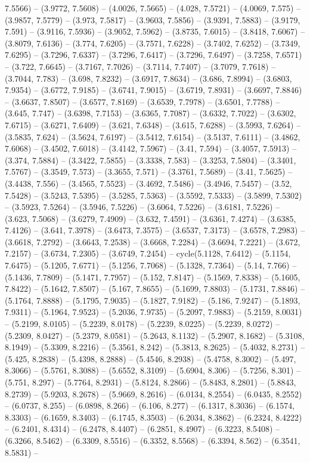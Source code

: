7.5566) -- (3.9772, 7.5608) -- (4.0026, 7.5665) -- (4.028, 7.5721) -- (4.0069, 7.575) -- (3.9857, 7.5779) -- (3.973, 7.5817) -- (3.9603, 7.5856) -- (3.9391, 7.5883) -- (3.9179, 7.591) -- (3.9116, 7.5936) -- (3.9052, 7.5962) -- (3.8735, 7.6015) -- (3.8418, 7.6067) -- (3.8079, 7.6136) -- (3.774, 7.6205) -- (3.7571, 7.6228) -- (3.7402, 7.6252) -- (3.7349, 7.6295) -- (3.7296, 7.6337) -- (3.7296, 7.6417) -- (3.7296, 7.6497) -- (3.7258, 7.6571) -- (3.722, 7.6645) -- (3.7167, 7.7026) -- (3.7114, 7.7407) -- (3.7079, 7.7618) -- (3.7044, 7.783) -- (3.698, 7.8232) -- (3.6917, 7.8634) -- (3.686, 7.8994) -- (3.6803, 7.9354) -- (3.6772, 7.9185) -- (3.6741, 7.9015) -- (3.6719, 7.8931) -- (3.6697, 7.8846) -- (3.6637, 7.8507) -- (3.6577, 7.8169) -- (3.6539, 7.7978) -- (3.6501, 7.7788) -- (3.645, 7.747) -- (3.6398, 7.7153) -- (3.6365, 7.7087) -- (3.6332, 7.7022) -- (3.6302, 7.6715) -- (3.6271, 7.6409) -- (3.621, 7.6348) -- (3.615, 7.6288) -- (3.5993, 7.6264) -- (3.5835, 7.624) -- (3.5624, 7.6197) -- (3.5412, 7.6154) -- (3.5137, 7.6111) -- (3.4862, 7.6068) -- (3.4502, 7.6018) -- (3.4142, 7.5967) -- (3.41, 7.594) -- (3.4057, 7.5913) -- (3.374, 7.5884) -- (3.3422, 7.5855) -- (3.3338, 7.583) -- (3.3253, 7.5804) -- (3.3401, 7.5767) -- (3.3549, 7.573) -- (3.3655, 7.571) -- (3.3761, 7.5689) -- (3.41, 7.5625) -- (3.4438, 7.556) -- (3.4565, 7.5523) -- (3.4692, 7.5486) -- (3.4946, 7.5457) -- (3.52, 7.5428) -- (3.5243, 7.5395) -- (3.5285, 7.5363) -- (3.5592, 7.5333) -- (3.5899, 7.5302) -- (3.5923, 7.5264) -- (3.5946, 7.5226) -- (3.6064, 7.5226) -- (3.6181, 7.5226) -- (3.623, 7.5068) -- (3.6279, 7.4909) -- (3.632, 7.4591) -- (3.6361, 7.4274) -- (3.6385, 7.4126) -- (3.641, 7.3978) -- (3.6473, 7.3575) -- (3.6537, 7.3173) -- (3.6578, 7.2983) -- (3.6618, 7.2792) -- (3.6643, 7.2538) -- (3.6668, 7.2284) -- (3.6694, 7.2221) -- (3.672, 7.2157) -- (3.6734, 7.2305) -- (3.6749, 7.2454) -- cycle(5.1128, 7.6412) -- (5.1154, 7.6475) -- (5.1205, 7.6771) -- (5.1256, 7.7068) -- (5.1328, 7.7364) -- (5.14, 7.766) -- (5.1436, 7.7809) -- (5.1471, 7.7957) -- (5.152, 7.8147) -- (5.1569, 7.8338) -- (5.1605, 7.8422) -- (5.1642, 7.8507) -- (5.167, 7.8655) -- (5.1699, 7.8803) -- (5.1731, 7.8846) -- (5.1764, 7.8888) -- (5.1795, 7.9035) -- (5.1827, 7.9182) -- (5.186, 7.9247) -- (5.1893, 7.9311) -- (5.1964, 7.9523) -- (5.2036, 7.9735) -- (5.2097, 7.9883) -- (5.2159, 8.0031) -- (5.2199, 8.0105) -- (5.2239, 8.0178) -- (5.2239, 8.0225) -- (5.2239, 8.0272) -- (5.2309, 8.0427) -- (5.2379, 8.0581) -- (5.2643, 8.1132) -- (5.2907, 8.1682) -- (5.3108, 8.1949) -- (5.3309, 8.2216) -- (5.3561, 8.242) -- (5.3813, 8.2625) -- (5.4032, 8.2731) -- (5.425, 8.2838) -- (5.4398, 8.2888) -- (5.4546, 8.2938) -- (5.4758, 8.3002) -- (5.497, 8.3066) -- (5.5761, 8.3088) -- (5.6552, 8.3109) -- (5.6904, 8.306) -- (5.7256, 8.301) -- (5.751, 8.297) -- (5.7764, 8.2931) -- (5.8124, 8.2866) -- (5.8483, 8.2801) -- (5.8843, 8.2739) -- (5.9203, 8.2678) -- (5.9669, 8.2616) -- (6.0134, 8.2554) -- (6.0435, 8.2552) -- (6.0737, 8.255) -- (6.0898, 8.266) -- (6.106, 8.277) -- (6.1317, 8.3036) -- (6.1574, 8.3303) -- (6.1659, 8.3403) -- (6.1745, 8.3503) -- (6.2034, 8.3862) -- (6.2324, 8.4222) -- (6.2401, 8.4314) -- (6.2478, 8.4407) -- (6.2851, 8.4907) -- (6.3223, 8.5408) -- (6.3266, 8.5462) -- (6.3309, 8.5516) -- (6.3352, 8.5568) -- (6.3394, 8.562) -- (6.3541, 8.5831) -- 